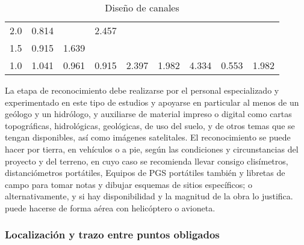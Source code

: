 \begin{table}[h!]
\begin{tabular}{@{}ccccccccc@{}}
    2.0             & 0.814             &                                                                         & 2.457                                            &          &              &          &         &             \\
    1.5             & 0.915             & 1.639                                                                   &                                                  &          &              &          &         &             \\
    1.0             & 1.041             & 0.961                                                                   & 0.915                                            & 2.397    & 1.982        & 4.334    & 0.553   & 1.982       \\ \bottomrule
    \end{tabular}
    \caption{Diseño de canales}
    \label{tabta21}
\end{table}

La etapa de reconocimiento debe realizarse por el personal especializado y experimentado en este tipo de estudios y apoyarse en particular al menos de un geólogo y un hidrólogo, y auxiliarse de material impreso o digital como cartas topográficas, hidrológicas, geológicas, de uso del suelo, y de otros temas que se tengan disponibles, así como imágenes satelitales.
El reconocimiento se puede hacer por tierra, en vehículos o a pie, según las condiciones y circunstancias del proyecto y del terreno, en cuyo caso se recomienda llevar consigo clisímetros, distanciómetros portátiles, Equipos de PGS portátiles también y libretas de campo para tomar notas y dibujar esquemas de sitios específicos; o alternativamente, y si hay disponibilidad y la magnitud de la obra lo justifica. puede hacerse de forma aérea con helicóptero o avioneta.

\subsubsection{Localización y trazo entre puntos obligados}

